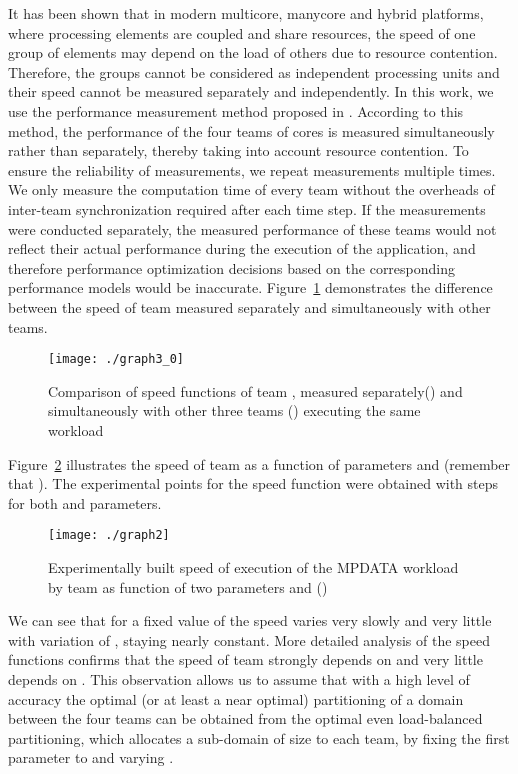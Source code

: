 \documentclass{acm_proc_article-sp}
\begin{document}
It has been shown \cite{ziming2011, zimingTC2014} that in modern multicore, manycore and hybrid platforms, where processing elements are coupled and share resources, the speed of one group of elements may depend on the load of others due to resource contention. Therefore, the groups cannot be considered as independent processing units and their speed cannot be measured separately and independently. In this work, we use the performance measurement method proposed in \cite{zimingTC2014} . According to this method, the performance of the four teams of cores is measured simultaneously rather than separately, thereby taking into account resource contention. To ensure the reliability of measurements, we repeat measurements multiple times. We only measure the computation time of every team without the overheads of inter-team synchronization required after each time step.  If the measurements were conducted separately, the measured performance of these teams would not reflect their actual performance during the execution of the application, and therefore performance optimization decisions based on the corresponding performance models would be inaccurate. Figure~\ref{fig:graph3_0} demonstrates the difference between the speed of team  measured separately and simultaneously with other teams.

\begin{figure}[h!]
\begin{center}
\texttt{[image: ./graph3\_0]}
\caption{Comparison of speed functions of team , measured separately() and simultaneously with other three teams () executing the same workload}
\label{fig:graph3_0}
\end{center}
\end{figure}
 

Figure~\ref{fig:graph2} illustrates the speed of team  as a function of parameters  and  (remember that ).
The experimental points for the speed function were obtained with steps  for both  and  parameters.


\begin{figure}[h!]
\begin{center}
\texttt{[image: ./graph2]}
\caption{Experimentally built speed of execution of the MPDATA workload by team  as function of two parameters  and  ()}
\label{fig:graph2}
\end{center}
\end{figure} 

We can see that for a fixed value of  the speed varies very slowly and very little with variation of , staying nearly constant.
More detailed analysis of the speed functions confirms that the speed of team strongly depends on  and very little depends on . This observation allows us to assume that with a high level of accuracy the optimal (or at least a near optimal) partitioning of a   domain between the four teams can be obtained from the optimal even load-balanced partitioning, which allocates a sub-domain of size  to each team, by fixing the first parameter  to  and varying . 
\end{document}
